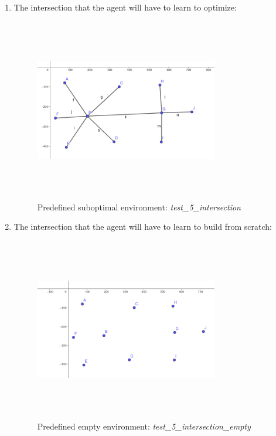 \documentclass[
]{elteikthesis}[2023/04/10]
\begin{document}
\begin{enumerate}
\item The intersection that the agent will have to learn to optimize: 
\begin{figure}[H]
\begin{centering}
\includegraphics[width=8cm,height=8cm,keepaspectratio]{images/test_5_intersection}
\par\end{centering}
\caption{Predefined suboptimal environment: \emph{test\_5\_intersection}}
\end{figure}
\item The intersection that the agent will have to learn to build from scratch:
\begin{figure}[H]
\begin{centering}
\includegraphics[width=8cm,height=8cm,keepaspectratio]{images/test_5_intersection_empty}
\par\end{centering}
\caption{Predefined empty environment: \emph{test\_5\_intersection\_empty}}
\end{figure}
\end{enumerate}
\end{document}
